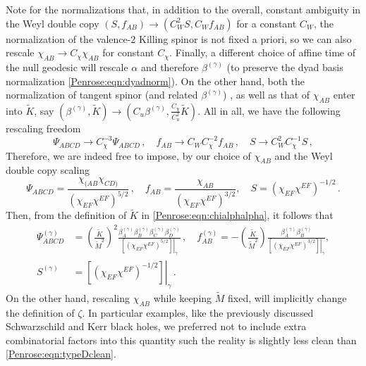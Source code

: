 Note for the normalizations that, in addition to the overall, constant ambiguity in the Weyl double copy $(S, f_{AB}) \to (C_{W}^2 S, C_{W} f_{AB})$ for a constant $C_{W}$, the normalization of the valence-2 Killing spinor is not fixed a priori, so we can also rescale $\chi_{AB} \to C_{\chi}\chi_{AB}$ for constant $C_{\chi}$. Finally, a different choice of affine time of the null geodesic will rescale $\alpha$ and therefore $\beta^{(\gamma)}$ (to preserve the dyad basis normalization \eqref{Penrose:eqn:dyadnorm}). On the other hand, both the normalization of tangent spinor (and related $\beta^{(\gamma)}$) , as well as that of $\chi_{AB}$ enter into $\tilde{K}$,  say $(\beta^{(\gamma)}, \tilde{K}) \to (C_u \beta^{(\gamma)}, \frac{C_{\chi}}{C_u^2}\tilde{K})$. All in all, we have the following rescaling freedom
\begin{equation}
\Psi_{ABCD} \to C^{-3}_{\chi} \Psi_{ABCD} \, , \quad f_{AB} \to C_{W} C^{-2}_{\chi} f_{AB} \, , \quad  S \to C_{W}^2 C^{-1}_{\chi} S \, ,
\end{equation}
Therefore, we are indeed free to impose, by our choice of $\chi_{AB}$ and the Weyl double copy scaling 
\begin{equation}\label{Penrose:eqn:typeDclean}
\Psi_{ABCD} =  \frac{\chi_{(AB} \chi_{CD)}}{\left(\chi_{EF}\chi^{EF}\right)^{5/2}} \, , \quad f_{AB} = \frac{\chi_{AB}}{\left(\chi_{EF}\chi^{EF}\right)^{3/2}} , \quad S = \left(\chi_{EF}\chi^{EF}\right)^{-1/2}  \, .
\end{equation}
Then, from the definition of $\tilde{K}$ in \eqref{Penrose:eqn:chialphalpha}, it follows that
\begin{equation}
\begin{aligned}
\Psi^{(\gamma)}_{ABCD} &=  \left(\frac{\tilde{K}}{\tilde{M}^2}\right)^2 \frac{\beta^{(\gamma)}_A \beta^{(\gamma)}_B \beta^{(\gamma)}_C \beta^{(\gamma)}_D}{\left. \left\lbrack\left(\chi_{EF}\chi^{EF}\right)^{5/2}\right\rbrack \right |_{\gamma}}  \, , \quad f^{(\gamma)}_{AB} = -\left(\frac{\tilde{K}}{\tilde{M}^2}\right) \frac{\beta^{(\gamma)}_A \beta^{(\gamma)}_B}{\left. \left\lbrack\left(\chi_{EF}\chi^{EF}\right)^{3/2}\right\rbrack \right|_{\gamma}} , \\ S^{(\gamma)} &= \left.\left\lbrack\left(\chi_{EF}\chi^{EF}\right)^{-1/2}\right\rbrack \right|_{\gamma}  \, .
\end{aligned}
\end{equation}
On the other hand, rescaling $\chi_{AB}$ while keeping $\tilde{M}$ fixed, will implicitly change the definition of $\zeta$. In particular examples, like the previously discussed Schwarzschild and Kerr black holes, we preferred not to include extra combinatorial factors into this quantity such the reality is slightly less clean than \eqref{Penrose:eqn:typeDclean}.


